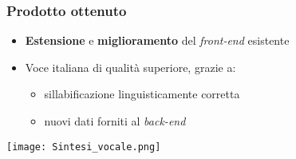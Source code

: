 \begin{frame}
  \frametitle{Prodotto ottenuto}
  \begin{itemize}
    \item \textbf{Estensione} e \textbf{miglioramento} del \textit{front-end} esistente
    \item Voce italiana di qualità superiore, grazie a:
      \begin{itemize}
        \item sillabificazione linguisticamente corretta
        \item nuovi dati forniti al \textit{back-end}
      \end{itemize}
  \end{itemize}
  \centering
  \texttt{[image: Sintesi\_vocale.png]}
\end{frame}


